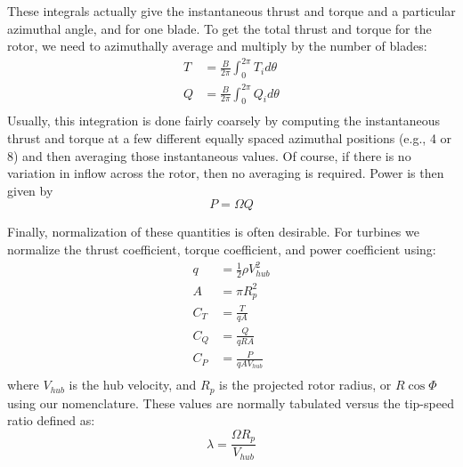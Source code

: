 \documentclass{article}
\begin{document}
These integrals actually give the instantaneous thrust and torque and a particular azimuthal angle, and for one blade.  To get the total thrust and torque for the rotor, we need to azimuthally average and multiply by the number of blades:
\begin{equation}
\begin{aligned}
    T &= \frac{B}{2\pi}\int_0^{2\pi} T_i d\theta\\
    Q &= \frac{B}{2\pi}\int_0^{2\pi} Q_i d\theta\\
\end{aligned}
\end{equation}
Usually, this integration is done fairly coarsely by computing the instantaneous thrust and torque at a few different equally spaced azimuthal positions (e.g., 4 or 8) and then averaging those instantaneous values.  Of course, if there is no variation in inflow across the rotor, then no averaging is required.  Power is then given by
\begin{equation}
    P = \Omega Q
\end{equation}

Finally, normalization of these quantities is often desirable.  For turbines we normalize the thrust coefficient, torque coefficient, and power coefficient using:
\begin{equation}
\begin{aligned}
q &= \frac{1}{2} \rho V_{hub}^2\\
A &= \pi R_p^2\\
C_T &= \frac{T}{q A}\\
C_Q &= \frac{Q}{q R A}\\
C_P &= \frac{P}{q A V_{hub}}\\
\end{aligned}
\end{equation}
where $V_{hub}$ is the hub velocity, and $R_p$ is the projected rotor radius, or $R \cos\Phi$ using our nomenclature.  These values are normally tabulated versus the tip-speed ratio defined as:
\begin{equation}
    \lambda = \frac{\Omega R_p}{V_{hub}}
\end{equation}
\end{document}
